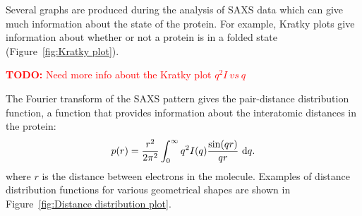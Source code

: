     Several graphs are produced during the analysis of SAXS data which can give much information about the state of the protein.
    For example, Kratky plots give information about whether or not a protein is in a folded state (Figure~\ref{fig:Kratky plot}).
    \textcolor{red}{
        \begin{myenumerate}
            \item \hypertarget{todo:more Kratky plot information}{\textbf{TODO:} Need more info about the Kratky plot $q^2I\ vs\ q$}
        \end{myenumerate}
    }
    The Fourier transform of the SAXS pattern gives the pair-distance distribution function, a function that provides information about the interatomic distances in the protein:
    \begin{equation}
        p(r) = \f{r^2}{2\pi^2}\int_0^{\infty}q^2 I(q) \f{\sin(qr)}{qr}\ \mathrm{d}q.
    \end{equation}
    where $r$ is the distance between electrons in the molecule.
    Examples of distance distribution functions for various geometrical shapes are shown in Figure~\ref{fig:Distance distribution plot}.
